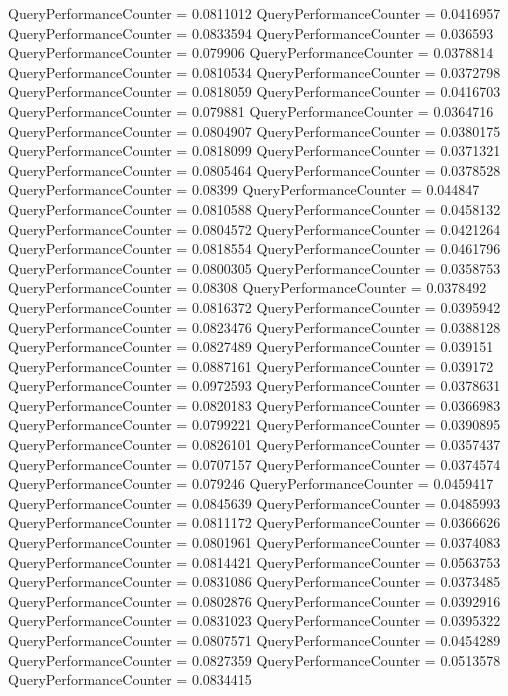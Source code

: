 \documentclass[9pt]{article}
\theoremstyle{plain}
\theoremstyle{definition}
\theoremstyle{remark}
\numberwithin{equation}{section}
\begin{document}
QueryPerformanceCounter  =  0.0811012
QueryPerformanceCounter  =  0.0416957
QueryPerformanceCounter  =  0.0833594
QueryPerformanceCounter  =  0.036593
QueryPerformanceCounter  =  0.079906
QueryPerformanceCounter  =  0.0378814
QueryPerformanceCounter  =  0.0810534
QueryPerformanceCounter  =  0.0372798
QueryPerformanceCounter  =  0.0818059
QueryPerformanceCounter  =  0.0416703
QueryPerformanceCounter  =  0.079881
QueryPerformanceCounter  =  0.0364716
QueryPerformanceCounter  =  0.0804907
QueryPerformanceCounter  =  0.0380175
QueryPerformanceCounter  =  0.0818099
QueryPerformanceCounter  =  0.0371321
QueryPerformanceCounter  =  0.0805464
QueryPerformanceCounter  =  0.0378528
QueryPerformanceCounter  =  0.08399
QueryPerformanceCounter  =  0.044847
QueryPerformanceCounter  =  0.0810588
QueryPerformanceCounter  =  0.0458132
QueryPerformanceCounter  =  0.0804572
QueryPerformanceCounter  =  0.0421264
QueryPerformanceCounter  =  0.0818554
QueryPerformanceCounter  =  0.0461796
QueryPerformanceCounter  =  0.0800305
QueryPerformanceCounter  =  0.0358753
QueryPerformanceCounter  =  0.08308
QueryPerformanceCounter  =  0.0378492
QueryPerformanceCounter  =  0.0816372
QueryPerformanceCounter  =  0.0395942
QueryPerformanceCounter  =  0.0823476
QueryPerformanceCounter  =  0.0388128
QueryPerformanceCounter  =  0.0827489
QueryPerformanceCounter  =  0.039151
QueryPerformanceCounter  =  0.0887161
QueryPerformanceCounter  =  0.039172
QueryPerformanceCounter  =  0.0972593
QueryPerformanceCounter  =  0.0378631
QueryPerformanceCounter  =  0.0820183
QueryPerformanceCounter  =  0.0366983
QueryPerformanceCounter  =  0.0799221
QueryPerformanceCounter  =  0.0390895
QueryPerformanceCounter  =  0.0826101
QueryPerformanceCounter  =  0.0357437
QueryPerformanceCounter  =  0.0707157
QueryPerformanceCounter  =  0.0374574
QueryPerformanceCounter  =  0.079246
QueryPerformanceCounter  =  0.0459417
QueryPerformanceCounter  =  0.0845639
QueryPerformanceCounter  =  0.0485993
QueryPerformanceCounter  =  0.0811172
QueryPerformanceCounter  =  0.0366626
QueryPerformanceCounter  =  0.0801961
QueryPerformanceCounter  =  0.0374083
QueryPerformanceCounter  =  0.0814421
QueryPerformanceCounter  =  0.0563753
QueryPerformanceCounter  =  0.0831086
QueryPerformanceCounter  =  0.0373485
QueryPerformanceCounter  =  0.0802876
QueryPerformanceCounter  =  0.0392916
QueryPerformanceCounter  =  0.0831023
QueryPerformanceCounter  =  0.0395322
QueryPerformanceCounter  =  0.0807571
QueryPerformanceCounter  =  0.0454289
QueryPerformanceCounter  =  0.0827359
QueryPerformanceCounter  =  0.0513578
QueryPerformanceCounter  =  0.0834415
\end{document}
